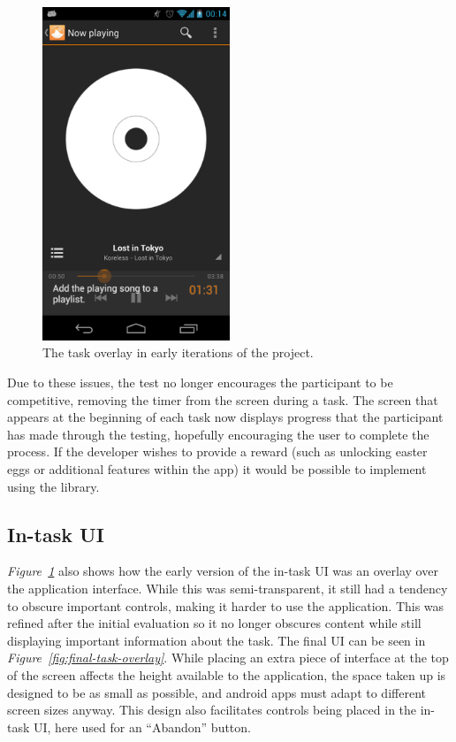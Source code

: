 \begin{figure}[ht!]
  \centering 
  \includegraphics[width=0.5\textwidth]{images/time-taken}
  \caption{The task overlay in early iterations of the project.}
  \label{fig:initial-overlay}
\end{figure}

Due to these issues, the test no longer encourages
the participant to be competitive, removing the timer from the screen during a task. The screen that appears at the beginning of each task now displays
progress that the participant has made through the testing, hopefully encouraging
the user to complete the process. If the developer wishes to provide a reward (such as
unlocking easter eggs or additional features within the app) it would be possible to implement using
the library.

\subsection{In-task UI}

\emph{Figure~\ref{fig:initial-overlay}} also shows how the early version of the in-task UI was an overlay over the application interface. While this was semi-transparent, it still had a tendency to obscure important controls, making it harder to use the application. This was refined after the initial evaluation so it no longer obscures content while still displaying important information about the task. The final UI can be seen in \emph{Figure~\ref{fig:final-task-overlay}}. While placing an extra piece of interface at the top of the screen affects the height available to the application, the space taken up is designed to be as small as possible, and android apps must adapt to different screen sizes anyway. This design also facilitates controls being placed in the in-task UI, here used for an ``Abandon'' button.

